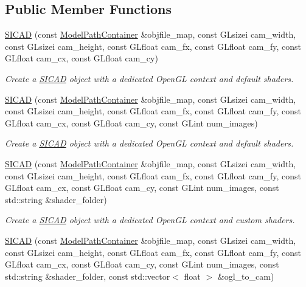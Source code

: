 \subsection*{Public Member Functions}
\begin{DoxyCompactItemize}
\item 
\mbox{\hyperlink{classSICAD_a4ff326a5104dad4c81898d3dd344205d}{S\+I\+C\+AD}} (const \mbox{\hyperlink{classSICAD_a9e1e1460d4c0f331b4fd015aae4dd721}{Model\+Path\+Container}} \&objfile\+\_\+map, const G\+Lsizei cam\+\_\+width, const G\+Lsizei cam\+\_\+height, const G\+Lfloat cam\+\_\+fx, const G\+Lfloat cam\+\_\+fy, const G\+Lfloat cam\+\_\+cx, const G\+Lfloat cam\+\_\+cy)
\begin{DoxyCompactList}\small\item\em Create a \mbox{\hyperlink{classSICAD}{S\+I\+C\+AD}} object with a dedicated Open\+GL context and default shaders. \end{DoxyCompactList}\item 
\mbox{\hyperlink{classSICAD_aa164d674fd047a3522efe18450094ab7}{S\+I\+C\+AD}} (const \mbox{\hyperlink{classSICAD_a9e1e1460d4c0f331b4fd015aae4dd721}{Model\+Path\+Container}} \&objfile\+\_\+map, const G\+Lsizei cam\+\_\+width, const G\+Lsizei cam\+\_\+height, const G\+Lfloat cam\+\_\+fx, const G\+Lfloat cam\+\_\+fy, const G\+Lfloat cam\+\_\+cx, const G\+Lfloat cam\+\_\+cy, const G\+Lint num\+\_\+images)
\begin{DoxyCompactList}\small\item\em Create a \mbox{\hyperlink{classSICAD}{S\+I\+C\+AD}} object with a dedicated Open\+GL context and default shaders. \end{DoxyCompactList}\item 
\mbox{\hyperlink{classSICAD_a3224c268f057e1eb18f6cf42ad099402}{S\+I\+C\+AD}} (const \mbox{\hyperlink{classSICAD_a9e1e1460d4c0f331b4fd015aae4dd721}{Model\+Path\+Container}} \&objfile\+\_\+map, const G\+Lsizei cam\+\_\+width, const G\+Lsizei cam\+\_\+height, const G\+Lfloat cam\+\_\+fx, const G\+Lfloat cam\+\_\+fy, const G\+Lfloat cam\+\_\+cx, const G\+Lfloat cam\+\_\+cy, const G\+Lint num\+\_\+images, const std\+::string \&shader\+\_\+folder)
\begin{DoxyCompactList}\small\item\em Create a \mbox{\hyperlink{classSICAD}{S\+I\+C\+AD}} object with a dedicated Open\+GL context and custom shaders. \end{DoxyCompactList}\item 
\mbox{\hyperlink{classSICAD_a2d0feeca1d62a456f861046e377cd303}{S\+I\+C\+AD}} (const \mbox{\hyperlink{classSICAD_a9e1e1460d4c0f331b4fd015aae4dd721}{Model\+Path\+Container}} \&objfile\+\_\+map, const G\+Lsizei cam\+\_\+width, const G\+Lsizei cam\+\_\+height, const G\+Lfloat cam\+\_\+fx, const G\+Lfloat cam\+\_\+fy, const G\+Lfloat cam\+\_\+cx, const G\+Lfloat cam\+\_\+cy, const G\+Lint num\+\_\+images, const std\+::string \&shader\+\_\+folder, const std\+::vector$<$ float $>$ \&ogl\+\_\+to\+\_\+cam)

\end{DoxyCompactItemize}

